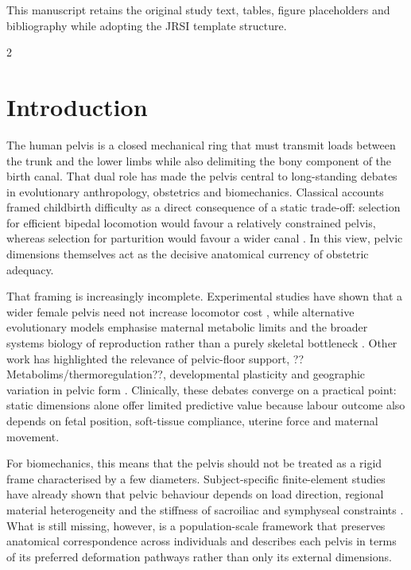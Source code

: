 \documentclass[openacc]{rsproca_new}
\begin{document}
\begin{fmtext}
This manuscript retains the original study text, tables, figure placeholders and bibliography while adopting the JRSI template structure.
\end{fmtext}

\maketitle

\begin{multicols}{2}
\section{Introduction}

The human pelvis is a closed mechanical ring that must transmit loads between the trunk and the lower limbs while also delimiting the bony component of the birth canal. That dual role has made the pelvis central to long-standing debates in evolutionary anthropology, obstetrics and biomechanics. Classical accounts framed childbirth difficulty as a direct consequence of a static trade-off: selection for efficient bipedal locomotion would favour a relatively constrained pelvis, whereas selection for parturition would favour a wider canal \cite{RosenbergTrevathan2002,Trevathan2015,Grunstra2023}. In this view, pelvic dimensions themselves act as the decisive anatomical currency of obstetric adequacy.

That framing is increasingly incomplete. Experimental studies have shown that a wider female pelvis need not increase locomotor cost \cite{Warrener2015}, while alternative evolutionary models emphasise maternal metabolic limits and the broader systems biology of reproduction rather than a purely skeletal bottleneck \cite{Dunsworth2012}. Other work has highlighted the relevance of pelvic-floor support, ??Metabolims/thermoregulation??, developmental plasticity and geographic variation in pelvic form \cite{Pavlicev2020,BettiManica2018,Novak2020}. Clinically, these debates converge on a practical point: static dimensions alone offer limited predictive value because labour outcome also depends on fetal position, soft-tissue compliance, uterine force and maternal movement.

For biomechanics, this means that the pelvis should not be treated as a rigid frame characterised by a few diameters. Subject-specific finite-element studies have already shown that pelvic behaviour depends on load direction, regional material heterogeneity and the stiffness of sacroiliac and symphyseal constraints \cite{Eichenseer2011,Hammer2013}. What is still missing, however, is a population-scale framework that preserves anatomical correspondence across individuals and describes each pelvis in terms of its preferred deformation pathways rather than only its external dimensions.


\end{multicols}
\end{document}
